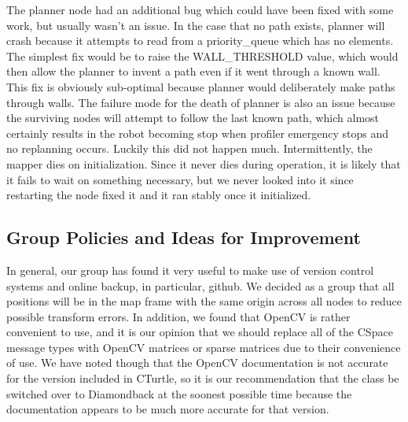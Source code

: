 \documentclass{article}
\begin{document}
The planner node had an additional bug which could have been fixed with some work, but usually wasn't an issue.  
In the case that no path exists, planner will crash because it attempts to read from a priority\_queue which has no elements.
The simplest fix would be to raise the WALL\_THRESHOLD value, which would then allow the planner to invent a path even if it went through a known wall.  
This fix is obviously sub-optimal because planner would deliberately make paths through walls.
The failure mode for the death of planner is also an issue because the surviving nodes will attempt to follow the last known path, which almost certainly results in the robot becoming stop when profiler emergency stops and no replanning occurs.  Luckily this did not happen much.
Intermittently, the mapper dies on initialization.  Since it never dies during operation, it is likely that it fails to wait on something necessary, but we never looked into it since restarting the node fixed it and it ran stably once it initialized.

\subsection{Group Policies and Ideas for Improvement}

In general, our group has found it very useful to make use of version control systems and online backup, in particular, github.
We decided as a group that all positions will be in the map frame with the same origin across all nodes to reduce possible transform errors.
In addition, we found that OpenCV is rather convenient to use, and it is our opinion that we should replace all of the CSpace message types with OpenCV matrices or sparse matrices due to their convenience of use.
We have noted though that the OpenCV documentation is not accurate for the version included in CTurtle, so it is our recommendation that the class be switched over to Diamondback at the soonest possible time because the documentation appears to be much more accurate for that version.
\end{document}
